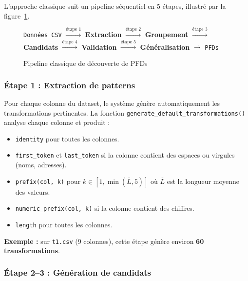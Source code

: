 \documentclass[12pt,a4paper]{article}
\begin{document}
L'approche classique suit un pipeline s\'{e}quentiel en 5 \'{e}tapes, illustr\'{e} par la figure~\ref{fig:pipeline}.

\begin{figure}[H]
\centering
\begin{tcolorbox}[colback=gray!5!white, colframe=gray!50!black, width=0.95\textwidth]
\centering
\texttt{Donn\'{e}es CSV} $\xrightarrow{\text{\'{e}tape 1}}$ \textbf{Extraction} $\xrightarrow{\text{\'{e}tape 2}}$ \textbf{Groupement} $\xrightarrow{\text{\'{e}tape 3}}$ \textbf{Candidats} $\xrightarrow{\text{\'{e}tape 4}}$ \textbf{Validation} $\xrightarrow{\text{\'{e}tape 5}}$ \textbf{G\'{e}n\'{e}ralisation} $\rightarrow$ \texttt{PFDs}
\end{tcolorbox}
\caption{Pipeline classique de d\'{e}couverte de PFDs}
\label{fig:pipeline}
\end{figure}

\subsubsection{\'{E}tape 1 : Extraction de patterns}

Pour chaque colonne du dataset, le syst\`{e}me g\'{e}n\`{e}re automatiquement les transformations pertinentes. La fonction \texttt{generate\_default\_transformations()} analyse chaque colonne et produit :

\begin{itemize}
    \item \texttt{identity} pour toutes les colonnes.
    \item \texttt{first\_token} et \texttt{last\_token} si la colonne contient des espaces ou virgules (noms, adresses).
    \item \texttt{prefix(col, k)} pour $k \in [1, \min(\overline{L}, 5)]$ o\`{u} $\overline{L}$ est la longueur moyenne des valeurs.
    \item \texttt{numeric\_prefix(col, k)} si la colonne contient des chiffres.
    \item \texttt{length} pour toutes les colonnes.
\end{itemize}

\textbf{Exemple :} sur \texttt{t1.csv} (9 colonnes), cette \'{e}tape g\'{e}n\`{e}re environ \textbf{60 transformations}.

\subsubsection{\'{E}tape 2--3 : G\'{e}n\'{e}ration de candidats}
\end{document}
